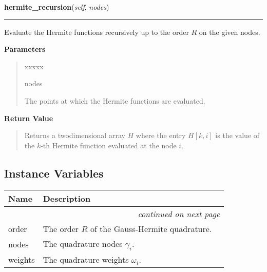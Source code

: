 \hspace{.8\funcindent}\begin{boxedminipage}{\funcwidth}

    \raggedright \textbf{hermite\_recursion}(\textit{self}, \textit{nodes})

    \vspace{-1.5ex}

    \rule{\textwidth}{0.5\fboxrule}
\setlength{\parskip}{2ex}
    Evaluate the Hermite functions recursively up to the order $R$ on the
    given nodes.

\setlength{\parskip}{1ex}
      \textbf{Parameters}
      \vspace{-1ex}

      \begin{quote}
        \begin{Ventry}{xxxxx}

          \item[nodes]

          The points at which the Hermite functions are evaluated.

        \end{Ventry}

      \end{quote}

      \textbf{Return Value}
    \vspace{-1ex}

      \begin{quote}
      Returns a twodimensional array $H$ where the entry $H[k,i]$ is
      the value of the $k$-th Hermite function evaluated at the node
      $i$.

      \end{quote}

    \end{boxedminipage}



  \subsection{Instance Variables}

    \vspace{-1cm}
\hspace{\varindent}\begin{longtable}{|p{\varnamewidth}|p{\vardescrwidth}|l}
\cline{1-2}
\cline{1-2} \centering \textbf{Name} & \centering \textbf{Description}& \\
\cline{1-2}
\endhead\cline{1-2}\multicolumn{3}{r}{\small\textit{continued on next page}}\\\endfoot\cline{1-2}
\endlastfoot\raggedright o\-r\-d\-e\-r\- & The order $R$ of the Gauss-Hermite quadrature.&\\
\cline{1-2}
\raggedright n\-o\-d\-e\-s\- & The quadrature nodes $\gamma_i$.&\\
\cline{1-2}
\raggedright w\-e\-i\-g\-h\-t\-s\- & The quadrature weights $\omega_i$.&\\
\cline{1-2}
\end{longtable}

